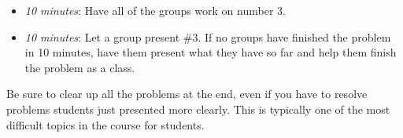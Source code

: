 \documentclass[handout,nooutcomes]{ximera}
\begin{document}
	\begin{itemize}
	
	\item  \emph{10 minutes}:  Have all of the groups work on number 3.  
	
	\item  \emph{10 minutes}:  Let a group present \#3.  If no groups have finished the problem in 10 minutes, have them present what they have so far and help them finish the problem as a class.
	
	\end{itemize}
	
	Be sure to clear up all the problems at the end, even if you have to resolve problems students just presented more clearly.  This is typically one of the most difficult topics in the course for students.
	


	
	
	

	
	

	
	
	

	
	
	
\end{document}
